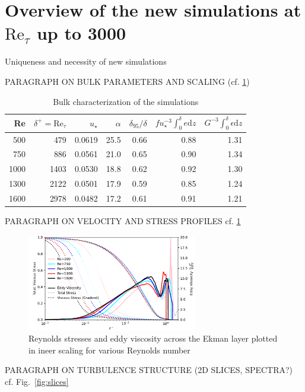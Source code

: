 \documentclass[a4paper,11pt]{amsart}
\newcommand{\RE}{\mathrm{Re}}
\begin{document}
\section{Overview of the new simulations at $\RE_\tau$ up to 3000}
%
Uniqueness and necessity of new simulations
%
\par
%
PARAGRAPH ON BULK PARAMETERS AND SCALING (cf. \ref{tab:bulk_results})
\begin{table}
  \caption{Bulk characterization of the simulations \label{tab:bulk_results}}
  \begin{tabular}{r r r r r r r }
    \toprule
    Re & $\delta^+=\RE_\tau$& $u_\star$ & $\alpha$ & $\delta_{95}/\delta$ & $f u_\star^{-3}\int_{0}^{\delta} e \mathrm{d} z $ & $ G^{-3}\int_{0}^{\delta} \epsilon \mathrm{d}z$\\
      \midrule 
      \rowcolor{gray!30} 
      500 & 479 & 0.0619& 25.5 & 0.66& 0.88& 1.31 \\
      \rowcolor{gray!30} 
      750 & 886 & 0.0561& 21.0 & 0.65& 0.90& 1.34 \\
      \rowcolor{gray!30}
      1000& 1403& 0.0530& 18.8 & 0.62& 0.92& 1.30 \\
      \midrule
      1300& 2122& 0.0501& 17.9 & 0.59& 0.85& 1.24 \\
      1600& 2978& 0.0482& 17.2 & 0.61& 0.91& 1.21 \\ 
      \bottomrule
    \end{tabular}
\end{table} 
%
\par
%
PARAGRAPH ON VELOCITY AND STRESS PROFILES cf. \ref{fig:stresses}
\begin{figure}
  \includegraphics[width=0.66\textwidth]{../plot/eddy_viscosity.pdf}
  \caption{Reynolds stresses and eddy viscosity across the Ekman layer plotted in ineer scaling for
    various Reynolds number
    \label{fig:stresses}} 
\end{figure} 
%
\par
%
PARAGRAPH ON TURBULENCE STRUCTURE (2D SLICES, SPECTRA?) cf. Fig.~\ref{fig:slices}  
\end{document}
